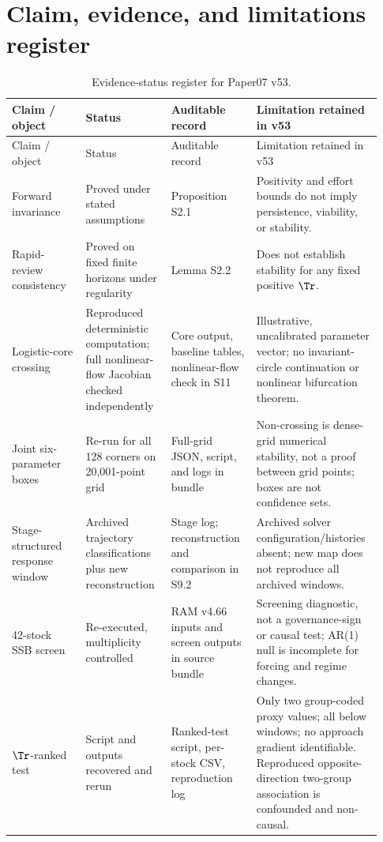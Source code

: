 \section{Claim, evidence, and limitations register}\label{si:status}

\begin{longtable}{@{}p{0.19\linewidth}p{0.22\linewidth}p{0.22\linewidth}p{0.30\linewidth}@{}}
\caption{Evidence-status register for Paper07 v53.}\label{tab:status}\\
\toprule
Claim / object & Status & Auditable record & Limitation retained in v53 \\
\midrule
\endfirsthead
\toprule
Claim / object & Status & Auditable record & Limitation retained in v53 \\
\midrule
\endhead
\bottomrule
\endlastfoot
Forward invariance & Proved under stated assumptions & Proposition S2.1 & Positivity and effort bounds do not imply persistence, viability, or stability. \\
Rapid-review consistency & Proved on fixed finite horizons under regularity & Lemma S2.2 & Does not establish stability for any fixed positive \(\Tr\). \\
Logistic-core crossing & Reproduced deterministic computation; full nonlinear-flow Jacobian checked independently & Core output, baseline tables, nonlinear-flow check in S11 & Illustrative, uncalibrated parameter vector; no invariant-circle continuation or nonlinear bifurcation theorem. \\
Joint six-parameter boxes & Re-run for all 128 corners on 20,001-point grid & Full-grid JSON, script, and logs in bundle & Non-crossing is dense-grid numerical stability, not a proof between grid points; boxes are not confidence sets. \\
Stage-structured response window & Archived trajectory classifications plus new reconstruction & Stage log; reconstruction and comparison in S9.2 & Archived solver configuration/histories absent; new map does not reproduce all archived windows. \\
42-stock SSB screen & Re-executed, multiplicity controlled & RAM v4.66 inputs and screen outputs in source bundle & Screening diagnostic, not a governance-sign or causal test; AR(1) null is incomplete for forcing and regime changes. \\
\(\Tr\)-ranked test & Script and outputs recovered and rerun & Ranked-test script, per-stock CSV, reproduction log & Only two group-coded proxy values; all below windows; no approach gradient identifiable. Reproduced opposite-direction two-group association is confounded and non-causal. \\

\end{longtable}
